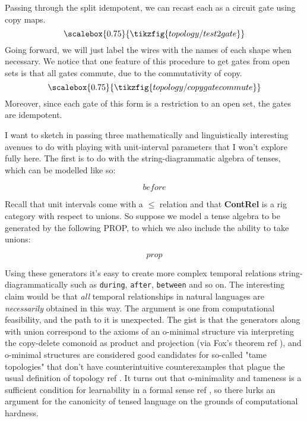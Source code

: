 Passing through the split idempotent, we can recast each as a circuit gate using copy maps.
\[\scalebox{0.75}{\tikzfig{topology/test2gate}}\]
Going forward, we will just label the wires with the names of each shape when necessary. We notice that one feature of this procedure to get gates from open sets is that all gates commute, due to the commutativity of copy.
\[\scalebox{0.75}{\tikzfig{topology/copygatecommute}}\]
Moreover, since each gate of this form is a restriction to an open set, the gates are idempotent. 






I want to sketch in passing three mathematically and linguistically interesting avenues to do with playing with unit-interval parameters that I won't explore fully here. The first is to do with the string-diagrammatic algebra of tenses, which can be modelled like so:

\[before\]

Recall that unit intervals come with a $\leq$ relation and that \textbf{ContRel} is a rig category with respect to unions. So suppose we model a tense algebra to be generated by the following PROP, to which we also include the ability to take unions:

\[prop\]

Using these generators it's easy to create more complex temporal relations string-diagrammatically such as \texttt{during}, \texttt{after}, \texttt{between} and so on. The interesting claim would be that \emph{all} temporal relationships in natural languages are \emph{necessarily} obtained in this way. The argument is one from computational feasibility, and the path to it is unexpected. The gist is that the generators along with union correspond to the axioms of an o-minimal structure via interpreting the copy-delete comonoid as product and projection (via Fox's theorem \bR ref \e), and o-minimal structures are considered good candidates for so-called "tame topologies" that don't have counterintuitive counterexamples that plague the usual definition of topology \bR ref \e. It turns out that o-minimality and tameness is a sufficient condition for learnability in a formal sense \bR ref \e, so there lurks an argument for the canonicity of tensed language on the grounds of computational hardness.\\

